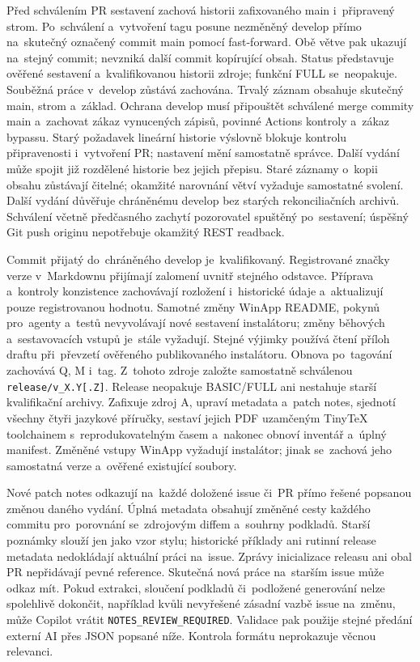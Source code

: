\documentclass[11pt,a4paper]{article}
\newcommand{\codeword}[1]{\nolinkurl{#1}}
\begin{document}
Před schválením PR sestavení zachová historii zafixovaného main i~připravený
strom. Po~schválení a~vytvoření tagu posune nezměněný develop přímo na~skutečný
označený commit main pomocí fast-forward. Obě větve pak ukazují na~stejný
commit;
nevzniká další commit kopírující obsah. Status představuje ověřené sestavení
a~kvalifikovanou historii zdroje; funkční FULL se~neopakuje. Souběžná práce
v~develop zůstává zachována. Trvalý záznam obsahuje skutečný main, strom
a~základ.
Ochrana develop musí připouštět schválené merge commity main a~zachovat zákaz
vynucených zápisů, povinné Actions kontroly a~zákaz bypassu. Starý požadavek
lineární historie výslovně blokuje kontrolu připravenosti i~vytvoření PR;
nastavení mění samostatně správce. Další vydání může spojit již rozdělené
historie bez jejich přepisu. Staré záznamy o~kopii obsahu zůstávají čitelné;
okamžité narovnání větví vyžaduje samostatné svolení.
Další vydání důvěřuje chráněnému
develop bez starých rekonciliačních archivů. Schválení včetně předčasného
zachytí
pozorovatel spuštěný po~sestavení; úspěšný Git push originu nepotřebuje okamžitý
REST readback.

Commit přijatý do~chráněného develop je~kvalifikovaný.
Registrované značky verze v~Markdownu přijímají zalomení uvnitř stejného
odstavce. Příprava a~kontroly konzistence zachovávají rozložení i~historické
údaje a~aktualizují pouze registrovanou hodnotu.
Samotné změny WinApp README, pokynů pro~agenty a~testů nevyvolávají nové
sestavení instalátoru; změny běhových a~sestavovacích vstupů je~stále vyžadují.
Stejné výjimky používá čtení příloh draftu při~převzetí ověřeného publikovaného
instalátoru. Obnova po~tagování zachovává Q, M i~tag.
Z~tohoto zdroje založte samostatně schválenou \codeword{release/v_X.Y[.Z]}.
Release neopakuje BASIC/FULL ani nestahuje starší kvalifikační archivy.
Zafixuje zdroj A, upraví metadata a~patch notes, sjednotí všechny čtyři
jazykové příručky, sestaví jejich PDF uzamčeným TinyTeX toolchainem
s~reprodukovatelným časem a~nakonec obnoví inventář a~úplný manifest.
Změněné vstupy WinApp vyžadují instalátor; jinak se~zachová jeho
samostatná verze a~ověřené existující soubory.

Nové patch notes odkazují na~každé doložené issue či~PR přímo řešené popsanou
změnou daného vydání. Úplná metadata obsahují změněné cesty každého commitu
pro~porovnání se~zdrojovým diffem a~souhrny podkladů. Starší poznámky slouží
jen jako vzor stylu; historické příklady ani rutinní release metadata
nedokládají aktuální práci na~issue. Zprávy inicializace releasu ani obal PR
nepřidávají pevné reference. Skutečná nová práce na~starším issue může odkaz
mít.
Pokud extrakci, sloučení podkladů či~podložené generování nelze spolehlivě
dokončit, například kvůli nevyřešené zásadní vazbě issue na~změnu, může Copilot
vrátit \codeword{NOTES_REVIEW_REQUIRED}. Validace pak použije stejné předání
externí AI přes JSON popsané níže. Kontrola formátu neprokazuje věcnou
relevanci.
\end{document}
